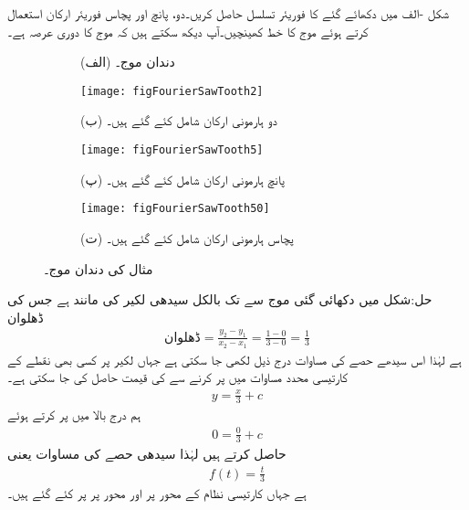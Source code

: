 شکل -الف میں دکھائے گئے  کا فوریئر تسلسل حاصل کریں۔دو، پانچ اور پچاس فوریئر ارکان استعمال کرتے ہوئے  موج کا خط کھینچیں۔آپ دیکھ سکتے ہیں کہ موج کا دوری عرصہ  ہے۔
\begin{figure}
\centering
\begin{subfigure}{0.5\textwidth}
\centering
{}
\caption*{(الف) دندان موج۔}
\end{subfigure}%
\begin{subfigure}{0.5\textwidth}
\centering
\texttt{[image: figFourierSawTooth2]}
\caption*{(ب) دو ہارمونی ارکان شامل کئے گئے ہیں۔}
\end{subfigure}
\begin{subfigure}{0.5\textwidth}
\centering
\texttt{[image: figFourierSawTooth5]}
\caption*{(پ) پانچ ہارمونی ارکان شامل کئے گئے ہیں۔}
\end{subfigure}%
\begin{subfigure}{0.5\textwidth}
\centering
\texttt{[image: figFourierSawTooth50]}
\caption*{(ت) پچاس ہارمونی ارکان شامل کئے گئے ہیں۔}
\end{subfigure}%
\caption{مثال  کی دندان موج۔}
\label{شکل_فوریئر_دندان_موج_الف}
\end{figure}

حل:شکل میں دکھائی گئی موج  سے  تک بالکل سیدھی لکیر کی مانند ہے جس کی ڈھلوان 
\begin{align*}
\text{ڈھلوان}=\frac{y_2-y_1}{x_2-x_1}=\frac{1-0}{3-0}=\frac{1}{3}
\end{align*}
ہے لہٰذا اس سیدھے حصے کی مساوات درج ذیل لکھی جا سکتی ہے جہاں لکیر پر کسی بھی نقطے کے کارتیسی محدد مساوات میں پر کرنے سے  کی قیمت حاصل کی جا سکتی ہے۔
\begin{align*}
y=\frac{x}{3}+c
\end{align*}
ہم درج بالا میں  پر کرتے ہوئے
\begin{align*}
0=\frac{0}{3}+c
\end{align*}
  حاصل کرتے ہیں لہٰذا سیدھی حصے کی مساوات  یعنی
\begin{align}
f(t)=\frac{t}{3}
\end{align}
ہے جہاں کارتیسی نظام کے  محور پر  اور  محور پر  پر کئے گئے ہیں۔

